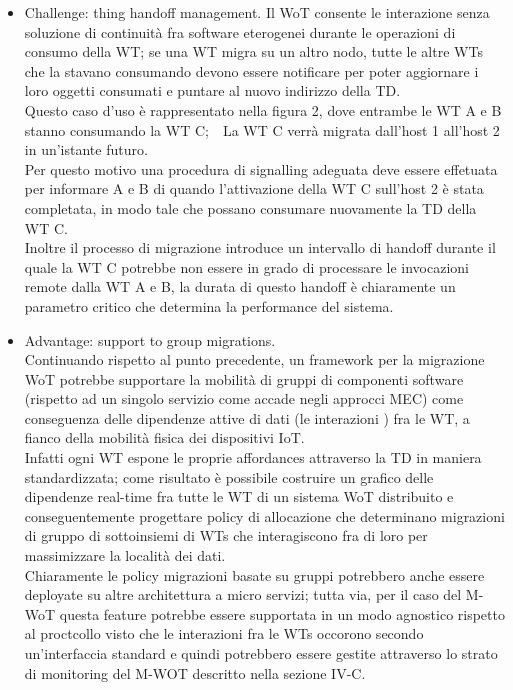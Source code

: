 \documentclass[11pt]{article}
\begin{document}
	\begin{itemize}
		\item Challenge: thing handoff management. Il WoT consente le interazione senza soluzione di continuità fra software eterogenei durante le operazioni di consumo della WT; se una WT migra su un altro nodo, tutte le altre WTs che la stavano consumando devono essere notificare per poter aggiornare i loro oggetti consumati e puntare al nuovo indirizzo della TD. \\
		Questo caso d'uso è rappresentato nella  figura 2, dove entrambe le WT A e B stanno consumando la WT C;\ \
		La WT C verrà migrata dall'host 1 all'host 2 in un'istante futuro. \\
		Per questo motivo una procedura di signalling adeguata deve essere effetuata per informare A e B di quando l'attivazione della WT C sull'host 2 è stata completata, in modo tale che possano consumare nuovamente la TD della WT C. \\
		Inoltre il processo di migrazione introduce un intervallo di handoff durante il quale la WT C potrebbe non essere in grado di processare le invocazioni remote dalla WT A e B, la durata di questo handoff è chiaramente un parametro critico che determina la performance del sistema.
		\item Advantage: support to group migrations.\\
		Continuando rispetto al punto precedente, un framework per la migrazione WoT potrebbe supportare la mobilità di gruppi di componenti software (rispetto ad un singolo servizio come accade negli approcci MEC) come conseguenza delle dipendenze attive di dati (le interazioni ) fra le WT, a fianco della mobilità fisica dei dispositivi IoT. \\
		Infatti ogni WT espone le proprie affordances attraverso la TD in maniera standardizzata; come risultato è possibile costruire un grafico delle dipendenze real-time fra tutte le WT di un sistema WoT distribuito e conseguentemente progettare policy di allocazione che determinano migrazioni di gruppo di sottoinsiemi di WTs che interagiscono fra di loro per massimizzare la località dei dati. \\
		Chiaramente le policy migrazioni basate su gruppi potrebbero anche essere deployate su altre architettura a micro servizi; tutta via, per il caso del M-WoT questa feature potrebbe essere supportata in un modo agnostico rispetto al proctcollo visto che le interazioni fra le WTs occorono secondo un'interfaccia standard e quindi potrebbero essere gestite attraverso lo strato di monitoring del M-WOT descritto nella sezione IV-C.
	\end{itemize}	
			
\end{document}
